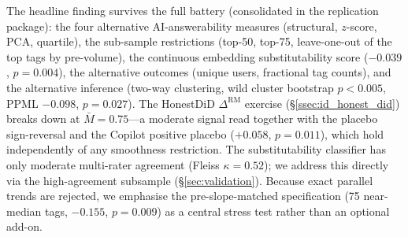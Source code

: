 \label{sec:robustness_body}

The headline finding survives the full battery (consolidated in
the replication package): the four alternative AI-answerability
measures (structural, $z$-score, PCA, quartile), the sub-sample
restrictions (top-50, top-75, leave-one-out of the top tags by
pre-volume), the continuous embedding substitutability score
($-0.039$, $p=0.004$), the alternative outcomes (unique users,
fractional tag counts), and the alternative inference (two-way
clustering, wild cluster bootstrap $p<0.005$, PPML $-0.098$,
$p=0.027$). The HonestDiD $\Delta^{\text{RM}}$ exercise
(\S\ref{ssec:id_honest_did}) breaks down at $\bar M=0.75$---a
moderate signal read together with the placebo sign-reversal and
the Copilot positive placebo ($+0.058$, $p=0.011$), which hold
independently of any smoothness restriction. The substitutability
classifier has only moderate multi-rater agreement (Fleiss
$\kappa=0.52$); we address this directly via the high-agreement
subsample (\S\ref{sec:validation}). Because exact parallel trends
are rejected, we emphasise the pre-slope-matched specification
(75 near-median tags, $-0.155$, $p=0.009$) as a central stress
test rather than an optional add-on.
